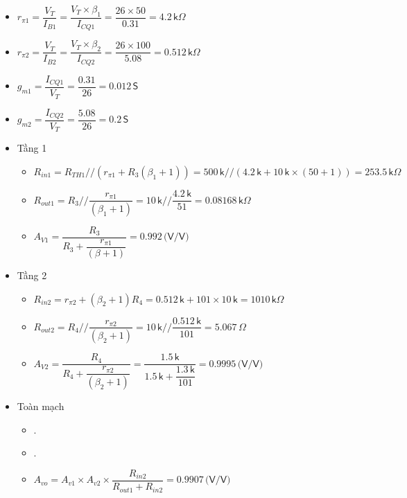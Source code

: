 \begin{itemize}[label=+, leftmargin=2cm]
	\item $r_{\pi1} = \dfrac{V_T}{I_{B1}} = \dfrac{V_T \times \beta_1}{I_{CQ1}} = \dfrac{26 \times 50}{0.31} = 4.2\,\textsf{k}\Omega$
	\item $r_{\pi2} = \dfrac{V_T}{I_{B2}} = \dfrac{V_T \times \beta_2}{I_{CQ2}} = \dfrac{26 \times 100}{5.08} = 0.512\,\textsf{k}\Omega$
	\item $g_{m1} = \dfrac{I_{CQ1}}{V_T} = \dfrac{0.31}{26} = 0.012\,\textsf{S}$
	\item $g_{m2} = \dfrac{I_{CQ2}}{V_T} = \dfrac{5.08}{26} = 0.2\,\textsf{S}$
\end{itemize}

\begin{itemize}[label=-]
	\item Tầng 1
	\begin{itemize}[label=+, leftmargin=2cm]
		\item $R_{in1} = R_{TH1} // (r_{\pi1} + R_3(\beta_1 + 1)) 
		= 500\,\textsf{k} // (4.2\,\textsf{k} + 10\,\textsf{k}\times(50 + 1)) 
		= 253.5\,\textsf{k}\Omega$
		
		\item $R_{out1} = R_3 // \dfrac{r_{\pi1}}{(\beta_1 + 1)} 
		= 10\,\textsf{k} // \dfrac{4.2\,\textsf{k}}{51} 
		= 0.08168\,\textsf{k}\Omega$
		
		\item $A_{V1} = 
		\dfrac{R_3}{R_3 + \dfrac{r_{\pi1}}{(\beta + 1)}} 
		= 0.992\,\textsf{(V/V)}$
	\end{itemize}
	
	\item Tầng 2
	\begin{itemize}[label=+, leftmargin=2cm]
		\item $R_{in2} = r_{\pi2} + (\beta_2 + 1)R_4 
		= 0.512\,\textsf{k} + 101\times10\,\textsf{k} 
		= 1010\,\textsf{k}\Omega$
		
		\item $R_{out2} = R_4 // \dfrac{r_{\pi2}}{(\beta_2 + 1)} 
		= 10\,\textsf{k} // \dfrac{0.512\,\textsf{k}}{101} 
		= 5.067\,\Omega$
		
		\item $A_{V2} = 
		\dfrac{R_4}{R_4 + \dfrac{r_{\pi2}}{(\beta_2 + 1)}} 
		= \dfrac{1.5\,\textsf{k}}{1.5\,\textsf{k} + \dfrac{1.3\,\textsf{k}}{101}} 
		= 0.9995\,\textsf{(V/V)}$
	\end{itemize}
	
	\item Toàn mạch
	\begin{itemize}[label=+, leftmargin=2cm]
		\item {}.
		\item {}.
		\item $A_{vo} = A_{v1} \times A_{v2} \times \dfrac{R_{in2}}{R_{out1} + R_{in2}} = 0.9907\,\textsf{(V/V)}$
		

\end{itemize}
\end{itemize}

